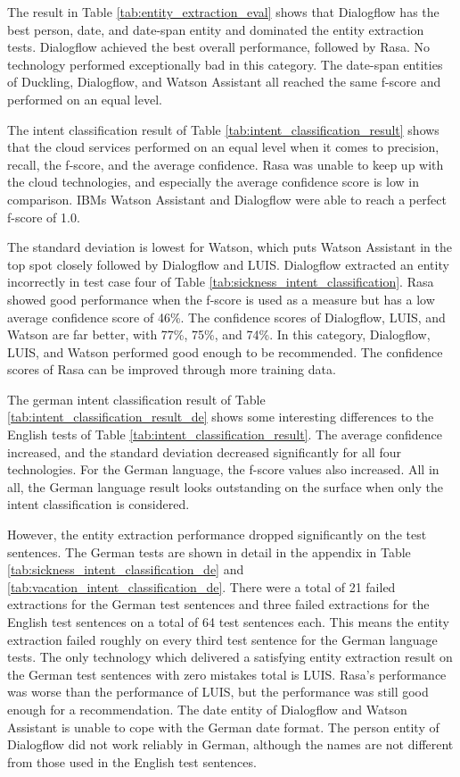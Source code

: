 The result in Table \ref{tab:entity_extraction_eval} shows that 
Dialogflow has the best person, date, and date-span entity and dominated the entity extraction tests.
Dialogflow achieved the best overall performance, followed by Rasa.
No technology performed exceptionally bad in this category. 
The date-span entities of Duckling, Dialogflow, and Watson Assistant all reached the same f-score and performed on an equal level.

The intent classification result of Table \ref{tab:intent_classification_result} shows that the cloud services performed on an equal level when it comes to precision, recall, the f-score, and the average confidence.
Rasa was unable to keep up with the cloud technologies, and especially the average confidence score is low in comparison.
IBMs Watson Assistant and Dialogflow were able to reach a perfect f-score of 1.0.

The standard deviation is lowest for Watson, which puts Watson Assistant in the top spot closely followed by Dialogflow and LUIS.
Dialogflow extracted an entity incorrectly in test case four of Table \ref{tab:sickness_intent_classification}.
Rasa showed good performance when the f-score is used as a measure but has a low average confidence score of 46\%.
The confidence scores of Dialogflow, LUIS, and Watson are far better, with 77\%, 75\%, and 74\%.
In this category, Dialogflow, LUIS, and Watson performed good enough to be recommended.
The confidence scores of Rasa can be improved through more training data.

The german intent classification result of Table \ref{tab:intent_classification_result_de} shows some interesting 
differences to the English tests of Table \ref{tab:intent_classification_result}.
The average confidence increased, and the standard deviation decreased significantly for all four technologies.
For the German language, the f-score values also increased.
All in all, the German language result looks outstanding on the surface when only the intent classification is considered.

However, the entity extraction performance dropped significantly on the test sentences.
The German tests are shown in detail in the appendix in Table \ref{tab:sickness_intent_classification_de} and \ref{tab:vacation_intent_classification_de}.
There were a total of 21 failed extractions for the German test sentences and three failed extractions for the English test sentences on a total of 64 test sentences each.
This means the entity extraction failed roughly on every third test sentence for the German language tests.
The only technology which delivered a satisfying entity extraction result on the German test sentences with zero mistakes total is LUIS.
Rasa's performance was worse than the performance of LUIS, but the performance was still good enough for a recommendation.
The date entity of Dialogflow and Watson Assistant is unable to cope with the German date format.
The person entity of Dialogflow did not work reliably in German, although the names are not different from those used in the English test sentences.

